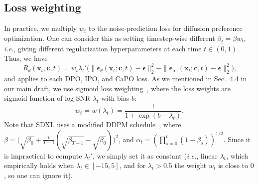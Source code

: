 \subsection{Loss weighting}\label{sec:lossweighting}
In practice, we multiply $w_t$ to the noise-prediction loss for diffusion preference optimization. One can consider this as setting timestep-wise different $\beta_t = \beta w_t$, \emph{i.e.}, giving different regularization hyperparameters at each time $t\in(0,1)$. Thus, we have 
\begin{equation}\label{eq:diffratioweight}
    R_\theta(\mathbf{x}_t, \mathbf{c}, t)  \! = \!  w_t\lambda_t'\big(\|\boldsymbol{\epsilon}_\theta(\mathbf{x}_t;\mathbf{c},t) - \boldsymbol{\epsilon}\|_2^2 - \|\boldsymbol{\epsilon}_{\textrm{ref}}(\mathbf{x}_t;\mathbf{c},t) -\boldsymbol{\epsilon}\|_2^2\big)\text{,}
\end{equation}
and applies to each DPO, IPO, and CaPO loss. 
As we mentioned in Sec.~4.4 in our main draft, we use sigmoid loss weighting~\citep{kingma2023understanding}, where the loss weights are sigmoid function of log-SNR $\lambda_t$ with bias $b$:
\begin{equation}
    w_t = w(\lambda_t) = \frac{1}{1+\exp(b - \lambda_t)}\text{.}
\end{equation}
Note that SDXL uses a modified DDPM schedule~\citep{ho2020denoising}, where $\beta = \big(\sqrt{\beta_0} + \tfrac{t}{T-1}(\sqrt{\beta_{T-1}} - \sqrt{\beta_0})\big)^2$, and $\alpha_t = (\prod_{s=0}^t (1-\beta_s))^{1/2}$.
Since it is impractical to compute $\lambda_t'$, we simply set it as constant (\emph{i.e.}, linear $\lambda_t$, which empirically holds when $\lambda_t \in [-15, 5]$, and for $\lambda_t > 0.5$ the weight $w_t$ is close to $0$, so one can ignore it).

